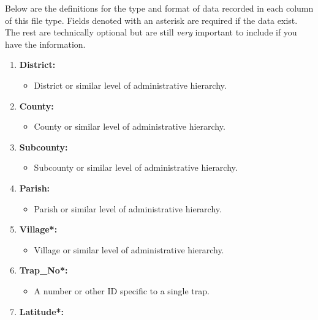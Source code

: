 \documentclass[letterpaper]{scrreprt}
\begin{document}
Below are the definitions for the type and format of data recorded in
each column of this file type. Fields denoted with an asterisk are
required if the data exist. The rest are technically optional but are
still \emph{very} important to include if you have the information.

\begin{enumerate}
\def\labelenumi{\Alph{enumi}.}
\itemsep1pt\parskip0pt
\item
  \textbf{District:}

  \begin{itemize}
  \itemsep1pt\parskip0pt
  \item
    District or similar level of administrative hierarchy.
  \end{itemize}
\item
  \textbf{County:}

  \begin{itemize}
  \itemsep1pt\parskip0pt
  \item
    County or similar level of administrative hierarchy.
  \end{itemize}
\item
  \textbf{Subcounty:}

  \begin{itemize}
  \itemsep1pt\parskip0pt
  \item
    Subcounty or similar level of administrative hierarchy.
  \end{itemize}
\item
  \textbf{Parish:}

  \begin{itemize}
  \itemsep1pt\parskip0pt
  \item
    Parish or similar level of administrative hierarchy.
  \end{itemize}
\item
  \textbf{Village*:}

  \begin{itemize}
  \itemsep1pt\parskip0pt
  \item
    Village or similar level of administrative hierarchy.
  \end{itemize}
\item
  \textbf{Trap\_No*:}

  \begin{itemize}
  \itemsep1pt\parskip0pt
  \item
    A number or other ID specific to a single trap.
  \end{itemize}
\item
  \textbf{Latitude*:}


\end{enumerate}
\end{document}
